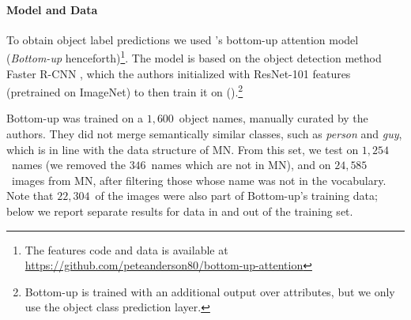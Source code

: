 \paragraph{Model and Data}
To obtain object label predictions we used \citeauthor{anderson2018updown}'s \citeyear{anderson2018updown} bottom-up attention model (\textit{Bottom-up} henceforth)\footnote{The features code and data is available at \url{https://github.com/peteanderson80/bottom-up-attention}}. 
The model is based on the object detection method Faster R-CNN \cite{fasterrcnn2015}, which the authors  initialized with ResNet-101 \cite{he2016deep} features (pretrained on ImageNet) to then train it on \vgenome (\vg).\footnote{Bottom-up is trained with an additional output over attributes, but we only use the object class prediction layer.} 
%
\iffalse
"To pretrain the bottom-up attention model, we first initialize Faster R-CNN with ResNet-101 pretrained for classification on ImageNet [35]. We then train on Visual
Genome [21] data. To aid the learning of good feature
representations, we add an additional training output for
predicting attribute classes (in addition to object classes).
To predict attributes for region i, we concatenate the mean
pooled convolutional feature vi with a learned embedding
of the ground-truth object class, and feed this into an additional output layer defining a softmax distribution over each
attribute class plus a ‘no attributes’ class.
The original Faster R-CNN multi-task loss function contains four components, defined over the classification and
bounding box regression outputs for both the RPN and the
final object class proposals respectively. We retain these
components and add an additional multi-class loss component to train the attribute predictor"
\fi

Bottom-up was trained on a $1,600$\ object names, manually curated by the authors. %
They did not merge semantically similar classes, such as \textsl{person} and \textsl{guy}, which is in line with the data structure of MN. %
%
From this set, we test on $1,254$~names (we removed the $346$\ names which are not in MN), and on $24,585$~images from MN, after filtering those whose \vg name was not in the vocabulary. 
Note that $22,304$~of the images were also part of Bottom-up's training data; below we report separate results for data in and out of the training set. 
%
